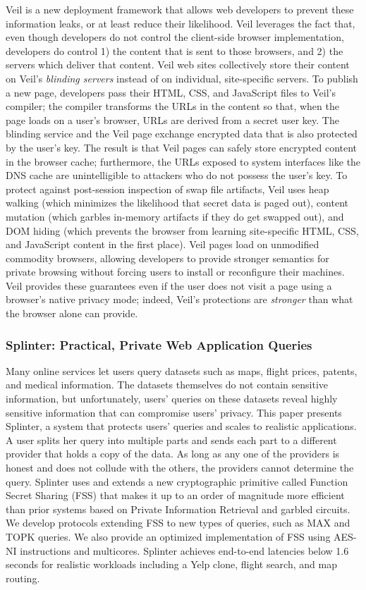 Veil is a new deployment framework that allows
web developers to prevent these information leaks,
or at least reduce their likelihood. Veil leverages
the fact that, even though developers do not control the
client-side browser implementation, developers do
control 1) the content that is sent to those browsers,
and 2) the servers which deliver that content.
Veil web sites collectively store their content
on Veil's \emph{blinding servers} instead
of on individual, site-specific servers. To publish
a new page, developers pass their HTML, CSS, and
JavaScript files to Veil's compiler; the compiler
transforms the URLs in the content so that, when
the page loads on a user's browser, URLs are derived
from a secret user key. The blinding service and
the Veil page exchange encrypted
data that is also protected by the user's key. The
result is that Veil pages can safely store encrypted
content in the browser cache; furthermore, the URLs exposed
to system interfaces like the DNS cache are
unintelligible to attackers who do not possess
the user's key. To protect against post-session
inspection of swap file artifacts, Veil uses
heap walking (which minimizes the likelihood that
secret data is paged out), content mutation (which
garbles in-memory artifacts if they do get swapped out),
and DOM hiding (which prevents the browser from
learning site-specific HTML, CSS, and JavaScript
content in the first place). Veil pages load on unmodified
commodity browsers, allowing developers to provide
stronger semantics for private browsing without forcing
users to install or reconfigure their machines. Veil
provides these guarantees even if the user does not
visit a page using a browser's native privacy mode;
indeed, Veil's protections are \emph{stronger}
than what the browser alone can provide.

\subsubsection{Splinter: Practical, Private Web Application Queries}

Many online services let users query datasets such as maps, flight prices, patents,
and medical information. The datasets themselves do not contain sensitive information,
but unfortunately, users' queries on these datasets reveal highly
sensitive information that can compromise users' privacy. 
This paper presents Splinter, a system that protects users' queries and
scales to realistic applications.
A user splits her query into multiple parts and sends each part 
to a different provider that holds a copy of the data.
As long as any one of the providers is honest and does not collude with the
others, the providers cannot determine the query.
Splinter uses and extends a new cryptographic primitive called Function Secret Sharing (FSS) that makes it up to an order of magnitude more efficient than prior systems based on Private Information Retrieval and garbled circuits.
We develop protocols extending FSS to new types of queries, such as MAX and TOPK queries. 
We also provide an optimized implementation of FSS using AES-NI instructions and multicores.
Splinter achieves end-to-end latencies below 1.6 seconds for realistic workloads including a Yelp clone, flight search, and map routing.

